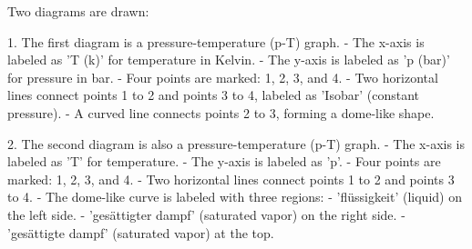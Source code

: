 Two diagrams are drawn:  

1. The first diagram is a pressure-temperature (p-T) graph.  
   - The x-axis is labeled as 'T (k)' for temperature in Kelvin.  
   - The y-axis is labeled as 'p (bar)' for pressure in bar.  
   - Four points are marked: 1, 2, 3, and 4.  
   - Two horizontal lines connect points 1 to 2 and points 3 to 4, labeled as 'Isobar' (constant pressure).  
   - A curved line connects points 2 to 3, forming a dome-like shape.  

2. The second diagram is also a pressure-temperature (p-T) graph.  
   - The x-axis is labeled as 'T' for temperature.  
   - The y-axis is labeled as 'p'.  
   - Four points are marked: 1, 2, 3, and 4.  
   - Two horizontal lines connect points 1 to 2 and points 3 to 4.  
   - The dome-like curve is labeled with three regions:  
     - 'flüssigkeit' (liquid) on the left side.  
     - 'gesättigter dampf' (saturated vapor) on the right side.  
     - 'gesättigte dampf' (saturated vapor) at the top.